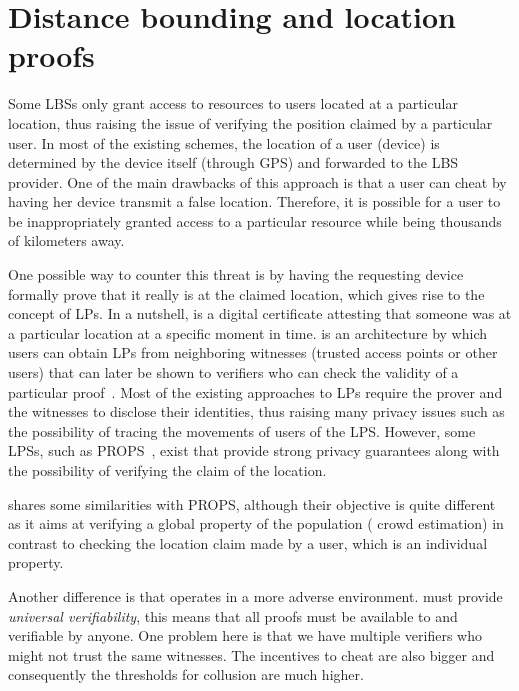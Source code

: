 \section{Distance bounding and location proofs}
\label{db-and-lp}
Some \acp{LBS} only grant access to resources to users located at a particular 
location, thus raising the issue of verifying the position claimed by a 
particular user.
In most of the existing schemes, the location of a user (device) is determined 
by the device itself (\eg through GPS) and forwarded to the \ac{LBS} provider.
One of the main drawbacks of this approach is that a user can cheat by having 
her device transmit a false location.
Therefore, it is possible for a user to be inappropriately granted access to a 
particular resource while being thousands of kilometers away.

One possible way to counter this threat is by having the requesting device 
formally prove that it really is at the claimed location, which gives rise to 
the concept of \acp{LP}.
In a nutshell,  is a digital certificate attesting that someone was at 
a particular location at a specific moment in time.
 is an architecture by which users can obtain \acp{LP} from 
neighboring witnesses (\eg trusted access points or other users) that can later 
be shown to verifiers who can check the validity of a particular 
proof~\cite{luo2010veriplace,zhu2011applaus}.
Most of the existing approaches to \acp{LP} require the prover and the 
witnesses to disclose their identities, thus raising many privacy issues such 
as the possibility of tracing the movements of users of the \ac{LPS}.
However, some \acp{LPS}, such as PROPS~\cite{PROPS}, exist that provide strong 
privacy guarantees along with the possibility of verifying the claim of the 
location.

\CROCUS shares some similarities with PROPS, although their objective is quite 
different as it aims at verifying a global property of the population (\ie 
crowd estimation) in contrast to checking the location claim made by a user, 
which is an individual property.

Another difference is that \CROCUS operates in a more adverse environment.
\CROCUS must provide \emph{universal verifiability}, this means that all proofs 
must be available to and verifiable by anyone.
One problem here is that we have multiple verifiers who might not trust the 
same witnesses.
The incentives to cheat are also bigger and consequently the thresholds for 
collusion are much higher.

